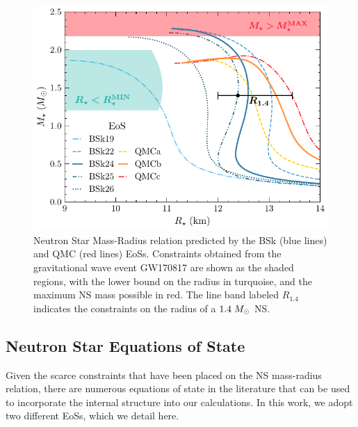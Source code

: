 \begin{figure}[t!bp]
    \centering
    \includegraphics{NS_mass_radius.pdf}
    \caption[Neutron Star Mass-Radius relation predicted by the BSk (blue lines) and QMC (red lines) EoSs.]{Neutron Star Mass-Radius relation predicted by the BSk (blue lines) and QMC (red lines) EoSs. Constraints obtained from the gravitational wave event GW170817 are shown as the shaded regions, with the lower bound on the radius in turquoise, and the maximum NS mass possible in red. The line band labeled $R_{1.4}$ indicates the constraints on the radius of a $1.4\;M_\odot$ NS.}
    \label{ch2:fig:NS_mass_rad}
\end{figure}



\subsection{Neutron Star Equations of State}
\label{ch2:subsec:NS_EoS}

Given the scarce constraints that have been placed on the NS mass-radius relation, there are numerous equations of state in the literature that can be used to incorporate the internal structure into our calculations. In this work, we adopt two different EoSs, which we detail here. 

